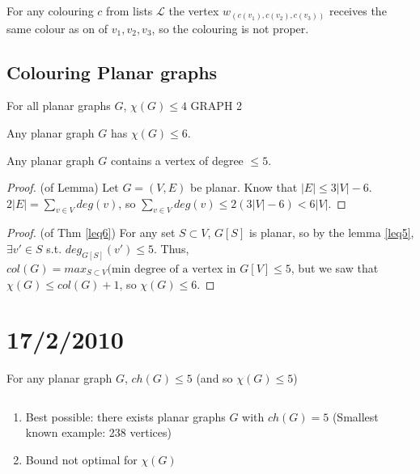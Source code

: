 \documentclass{article}
\begin{document}
For any colouring $c$ from lists $\mathcal{L}$ the vertex $w_{(c(v_1),c({v_2}),c(v_3))}$ receives the same colour as on of $v_1, v_2, v_3$, so the colouring is not proper.

\subsection*{Colouring Planar graphs}
For all planar graphs $G$, $\chi(G) \leq 4$ GRAPH 2

\begin{thm}
\label{leq6}
 Any planar graph $G$ has $\chi(G) \leq 6$.
\end{thm}

\begin{lem}
\label{leq5}
Any planar graph $G$ contains a vertex of degree $\leq 5$.
\end{lem}

\begin{proof}
(of Lemma)
 Let $G=(V,E)$ be planar. Know that $|E| \leq 3 |V| -6$.  $2 |E| = \displaystyle \sum_{v \in V} deg(v)$, so $\displaystyle \sum_{v \in V} deg(v) \leq 2 (3 |V| -6) < 6|V|$.
\end{proof}

\begin{proof}
(of Thm \ref{leq6}) For any set $S \subset V$, $G[S]$ is planar, so by the lemma \ref{leq5}, $\exists v' \in S$ s.t. $deg_{G[S]} (v') \leq 5$.  Thus, $col(G) = \displaystyle max_{S \subset V}(\text{min degree of a vertex in }G[V] \leq 5$, but we saw that $\chi(G) \leq col(G) +1$, so $\chi(G) \leq 6$.
\end{proof}

\section*{17/2/2010}

\begin{thm}
\label{chi5}
For any planar graph $G$, $ch(G) \leq 5$ (and so $\chi(G) \leq 5$)
\end{thm}

\begin{rem}
$ $
\begin{enumerate}
 \item Best possible: there exists planar graphs $G$ with $ch(G)=5$ (Smallest known example: 238 vertices)
\item Bound not optimal for $\chi(G)$
\end{enumerate}
\end{rem}
\end{document}
